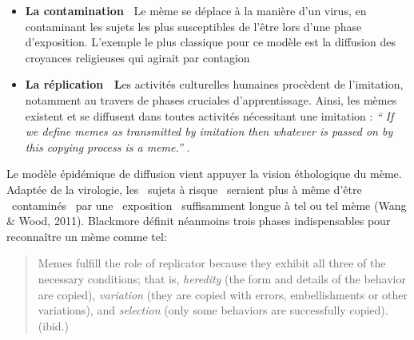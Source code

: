 \begin{itemize}
\item
\textbf{La contamination~\newline
}Le m\`eme se d\'eplace \`a la mani\`ere d{\textquoteright}un virus, en contaminant les sujets les plus susceptibles de l{\textquoteright}\^etre lors d{\textquoteright}une phase d{\textquoteright}exposition. L{\textquoteright}exemple le plus classique pour ce mod\`ele est la diffusion des croyances religieuses
qui agirait par contagion \citep{Dennett2006}
\item
\textbf{La r\'eplication~\newline
L}es activit\'es culturelles humaines proc\`edent de l{\textquoteright}imitation, notamment au travers de phases cruciales d{\textquoteright}apprentissage. Ainsi, les m\`emes existent et se diffusent dans toutes activit\'es n\'ecessitant une imitation : \textit{{\textquotedblleft}} \textit{If we define memes as transmitted by imitation then whatever is passed on by this copying process is a meme.{\textquotedblright} }\citep{Blackmore2006}. 
\end{itemize}

Le mod\`ele \'epid\'emique de diffusion vient appuyer la vision \'ethologique du m\`eme. Adapt\'ee de la virologie, les {\guillemotleft}~sujets \`a risque~{\guillemotright} seraient plus \`a m\^eme d{\textquoteright}\^etre {\guillemotleft}~contamin\'es~{\guillemotright} par une {\guillemotleft}~exposition~{\guillemotright} suffisamment longue \`a tel ou tel m\`eme (Wang \& Wood, 2011). Blackmore d\'efinit n\'eanmoins trois phases indispensables pour reconna\^itre un m\`eme comme tel:  

\begin{quote}
Memes fulfill the role of replicator because they exhibit all three of the necessary conditions; that is, \textit{heredity} (the form and details of the behavior are copied), \textit{variation} (they are copied with errors, embellishments or other variations), and \textit{selection} (only some behaviors are
successfully copied).
(ibid.)
\end{quote}

